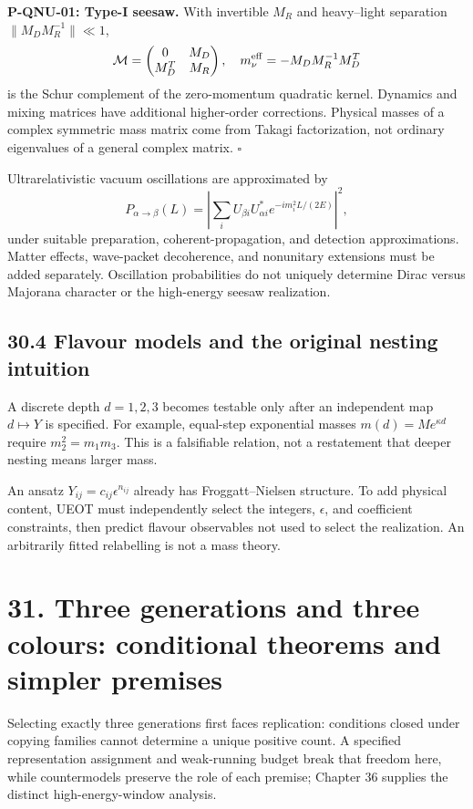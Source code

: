 \documentclass[
  11pt,
  oneside]{book}
\begin{document}
\label{p-qnu-01}{}

\textbf{P-QNU-01: Type-I seesaw.} With invertible \(M_R\) and
heavy--light separation \(\|M_D M_R^{-1}\|\ll1\), \[
\mathcal M=\begin{pmatrix}0&M_D\\M_D^T&M_R\end{pmatrix},
\quad m_\nu^{\rm eff}=-M_DM_R^{-1}M_D^T
\] is the Schur complement of the zero-momentum quadratic kernel.
Dynamics and mixing matrices have additional higher-order corrections.
Physical masses of a complex symmetric mass matrix come from Takagi
factorization, not ordinary eigenvalues of a general complex matrix.
\(\square\)

Ultrarelativistic vacuum oscillations are approximated by \[
P_{\alpha\to\beta}(L)=
\left|\sum_i U_{\beta i}U_{\alpha i}^*
e^{-im_i^2L/(2E)}\right|^2,
\] under suitable preparation, coherent-propagation, and detection
approximations. Matter effects, wave-packet decoherence, and nonunitary
extensions must be added separately. Oscillation probabilities do not
uniquely determine Dirac versus Majorana character or the high-energy
seesaw realization.

\section{30.4 Flavour models and the original nesting intuition}

A discrete depth \(d=1,2,3\) becomes testable only after an independent
map \(d\mapsto Y\) is specified. For example, equal-step exponential
masses \(m(d)=Me^{\kappa d}\) require \(m_2^2=m_1m_3\). This is a
falsifiable relation, not a restatement that deeper nesting means larger
mass.

An ansatz \(Y_{ij}=c_{ij}\epsilon^{n_{ij}}\) already has
Froggatt--Nielsen structure. To add physical content, UEOT must
independently select the integers, \(\epsilon\), and coefficient
constraints, then predict flavour observables not used to select the
realization. An arbitrarily fitted relabelling is not a mass theory.

\chapter{31. Three generations and three colours: conditional theorems
and simpler premises}\label{ch-31}

Selecting exactly three generations first faces replication: conditions
closed under copying families cannot determine a unique positive count.
A specified representation assignment and weak-running budget break that
freedom here, while countermodels preserve the role of each premise;
Chapter 36 supplies the distinct high-energy-window analysis.
\end{document}
